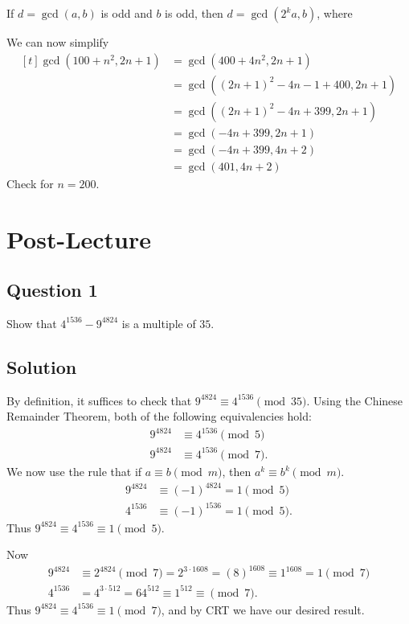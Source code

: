 \documentclass{article}
\begin{document}
    \vspace{1.5mm}
    If $d = \gcd(a, b)$ is odd and $b$ is odd, then $d = \gcd(2^{k}a, b)$, where 
    
    We can now simplify
    $$\begin{aligned}[t]
        \gcd(100 + n^{2}, 2n + 1) &= \gcd(400 + 4n^{2}, 2n + 1) \\
        &= \gcd((2n + 1)^{2} - 4n - 1 + 400, 2n + 1) \\
        &= \gcd((2n + 1)^{2} - 4n + 399, 2n + 1) \\
        &= \gcd(-4n + 399, 2n + 1) \\
        &= \gcd(-4n + 399, 4n + 2) \\
        &= \gcd(401, 4n + 2)
    \end{aligned}$$
    Check for $n = 200$.

\section*{Post-Lecture}

\subsection*{Question 1}
    Show that $4^{1536} - 9^{4824}$ is a multiple of $35$.

\subsection*{Solution}
    By definition, it suffices to check that $9^{4824} \equiv 4^{1536} \pmod{35}$. Using the Chinese Remainder Theorem, both of the following equivalencies hold:
    \begin{align*}
        9^{4824} &\equiv 4^{1536} \pmod{5} \\
        9^{4824} &\equiv 4^{1536} \pmod{7}.
    \end{align*}
    We now use the rule that if $a \equiv b \pmod{m}$, then $a^{k} \equiv b^{k} \pmod{m}$.
    \begin{align*}
        9^{4824} &\equiv (-1)^{4824} = 1 \pmod{5} \\
        4^{1536} &\equiv (-1)^{1536} = 1 \pmod{5}.
    \end{align*}
    Thus $9^{4824} \equiv 4^{1536} \equiv 1 \pmod{5}$.
    
    Now 
    \begin{align*}
        9^{4824} &\equiv 2^{4824} \pmod{7} = 2^{3 \cdot 1608} = (8)^{1608} \equiv 1^{1608} = 1 \pmod{7} \\
        4^{1536} &= 4^{3 \cdot 512} = 64^{512} \equiv 1^{512} \equiv \pmod{7}.
    \end{align*}
    Thus $9^{4824} \equiv 4^{1536} \equiv 1 \pmod{7}$, and by CRT we have our desired result.
\end{document}
